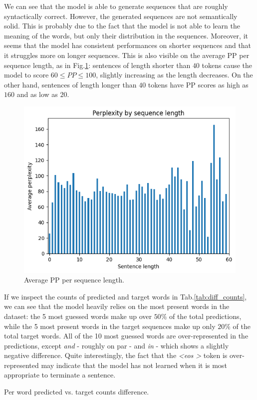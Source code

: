 We can see that the model is able to generate sequences that are roughly syntactically correct. However, the generated sequences are not semantically solid. This is probably due to the fact that the model is not able to learn the meaning of the words, but only their distribution in the sequences. Moreover, it seems that the model has consistent performances on shorter sequences and that it struggles more on longer sequences. This is also visible on the average PP per sequence length, as in Fig.\ref{fig:avg_pp_per_seq_len}: sentences of length shorter than $40$ tokens cause the model to score $60 \le PP \le 100$, slightly increasing as the length decreases. On the other hand, sentences of length longer than $40$ tokens have PP scores as high as $160$ and as low as $20$.
\begin{figure}
    \centering
    \includegraphics[width=.45\textwidth]{./assets/images/ppl_by_len}
    \caption{Average PP per sequence length.}
    \label{fig:avg_pp_per_seq_len}
\end{figure}

If we inspect the counts of predicted and target words in Tab.\ref{tab:diff_counts}, we can see that the model heavily relies on the most present words in the dataset: the 5 most guessed words make up over $50\%$ of the total predictions, while the 5 most present words in the target sequences make up only $20\%$ of the total target words. All of the 10 most guessed words are over-represented in the predictions, except \emph{and} - roughly on par - and \emph{in} - which shows a slightly negative difference. Quite interestingly, the fact that the \emph{\textless eos \textgreater} token is over-represented may indicate that the model has not learned when it is most appropriate to terminate a sentence. 

\begin{table}
    \centering
    
    \caption{Per word predicted vs. target counts difference.}
    \label{tab:diff_counts}
\end{table}

